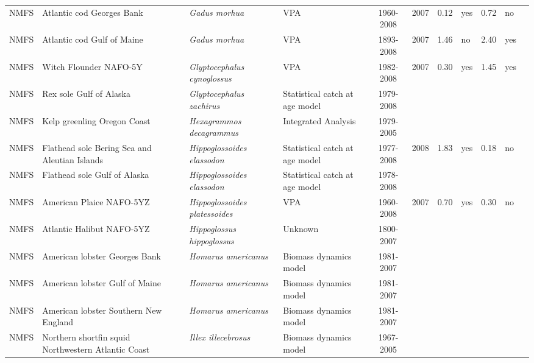 \begin{longtable}{p{1.8cm}p{3.5cm}p{3.5cm}p{3cm}cccp{0.9cm}cp{0.9cm}c}
  NMFS & Atlantic cod Georges Bank & \textit{Gadus morhua} & VPA & 1960-2008 & 2007 & 0.12 & yes & 0.72 & no & \cite{NMFS-GB-Gadusmorhua-2008.pdf} \\ 
  NMFS & Atlantic cod Gulf of Maine & \textit{Gadus morhua} & VPA & 1893-2008 & 2007 & 1.46 & no & 2.40 & yes & \cite{NMFS-GOM-Gadusmorhua-2008.pdf} \\ 
  NMFS & Witch Flounder NAFO-5Y & \textit{Glyptocephalus cynoglossus} & VPA & 1982-2008 & 2007 & 0.30 & yes & 1.45 & yes & \cite{crd0815.pdf} \\ 
  NMFS & Rex sole Gulf of Alaska & \textit{Glyptocephalus zachirus} & Statistical catch at age model & 1979-2008 &  &  &  &  &  & \cite{ref2008-SAFE-GOArex.pdf} \\ 
  NMFS & Kelp greenling Oregon Coast & \textit{Hexagrammos decagrammus} & Integrated Analysis & 1979-2005 &  &  &  &  &  & \cite{KelpGreenling_2005.pdf} \\ 
  NMFS & Flathead sole Bering Sea and Aleutian Islands & \textit{Hippoglossoides elassodon} & Statistical catch at age model & 1977-2008 & 2008 & 1.83 & yes & 0.18 & no & \cite{2008_SAFE_BSAIflathead.pdf} \\ 
  NMFS & Flathead sole Gulf of Alaska & \textit{Hippoglossoides elassodon} & Statistical catch at age model & 1978-2008 &  &  &  &  &  & \cite{2008_SAFE_GOAflathead.pdf} \\ 
  NMFS & American Plaice NAFO-5YZ & \textit{Hippoglossoides platessoides} & VPA & 1960-2008 & 2007 & 0.70 & yes & 0.30 & no & \cite{ .pdf} \\ 
  NMFS & Atlantic Halibut NAFO-5YZ & \textit{Hippoglossus hippoglossus} & Unknown & 1800-2007 &  &  &  &  &  & \cite{AtlanticHalibut5YZ2008.pdf .pdf} \\ 
  NMFS & American lobster Georges Bank & \textit{Homarus americanus} & Biomass dynamics model & 1981-2007 &  &  &  &  &  & \cite{2009-ASMFC-Am-Lob.pdf} \\ 
  NMFS & American lobster Gulf of Maine & \textit{Homarus americanus} & Biomass dynamics model & 1981-2007 &  &  &  &  &  & \cite{2009-ASMFC-Am-Lob.pdf} \\ 
  NMFS & American lobster Southern New England & \textit{Homarus americanus} & Biomass dynamics model & 1981-2007 &  &  &  &  &  & \cite{2009-ASMFC-Am-Lob.pdf} \\ 
  NMFS & Northern shortfin squid Northwestern Atlantic Coast & \textit{Illex illecebrosus} & Biomass dynamics model & 1967-2005 &  &  &  &  &  & \cite{scr06-46.pdf} \\ 

\end{longtable}
